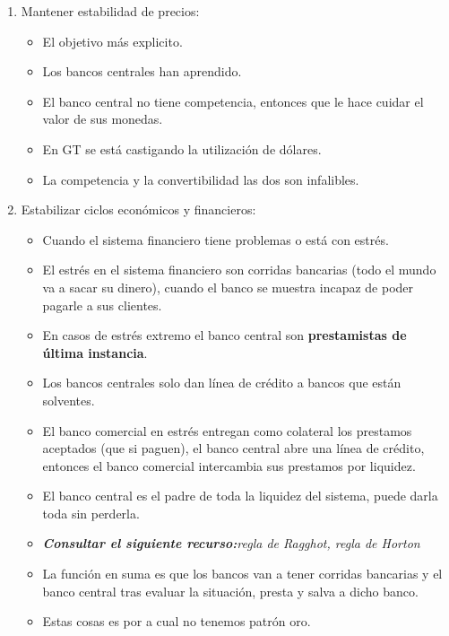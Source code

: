 \begin{enumerate}
    \item Mantener estabilidad de precios:
        \begin{itemize}
            \item El objetivo más explicito.
            \item Los bancos centrales han aprendido.
            \item El banco central no tiene competencia, entonces que le hace cuidar el valor de sus monedas.
            \item En GT se está castigando la utilización de dólares.
            \item La competencia y la convertibilidad las dos son infalibles.
        \end{itemize}
    
    \item Estabilizar ciclos económicos y financieros:
        \begin{itemize}
            \item Cuando el sistema financiero tiene problemas o está con estrés.
            \item El estrés en el sistema financiero son corridas bancarias (todo el mundo va a sacar su dinero), cuando el banco se muestra incapaz de poder pagarle a sus clientes.
            \item En casos de estrés extremo el banco central son \textbf{prestamistas de última instancia}. 
            \item Los bancos centrales solo dan línea de crédito a bancos que están solventes.
            \item El banco comercial en estrés entregan como colateral los prestamos aceptados (que si paguen), el banco central abre una línea de crédito, entonces el banco comercial intercambia sus prestamos por liquidez.
            \item El banco central es el padre de toda la liquidez del sistema, puede darla toda sin perderla.
            \item \emph{\textbf{Consultar el siguiente recurso:}regla de Ragghot, regla de Horton}
            \item La función en suma es que los bancos van a tener corridas bancarias y el banco central tras evaluar la situación, presta y salva a dicho banco.
            \item Estas cosas es por a cual no tenemos patrón oro.
        \end{itemize}
    

\end{enumerate}
